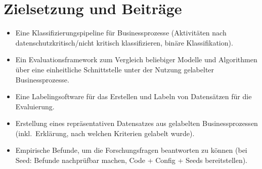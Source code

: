 \section{Zielsetzung und Beiträge}\label{sec:zielsetzung-und-beitrage}
\begin{itemize}
    \item Eine Klassifizierungspipeline für Businessprozesse (Aktivitäten nach datenschutzkritisch/nicht kritisch klassifizieren, binäre Klassifikation).
    \item Ein Evaluationsframework zum Vergleich beliebiger Modelle und Algorithmen über eine einheitliche Schnittstelle unter der Nutzung gelabelter Businessprozesse.
    \item Eine Labelingsoftware für das Erstellen und Labeln von Datensätzen für die Evaluierung.
    \item Erstellung eines repräsentativen Datensatzes aus gelabelten Businessprozessen (inkl.\ Erklärung, nach welchen Kriterien gelabelt wurde).
    \item Empirische Befunde, um die Forschungsfragen beantworten zu können (bei Seed: Befunde nachprüfbar machen, Code + Config + Seeds bereitstellen).
\end{itemize}